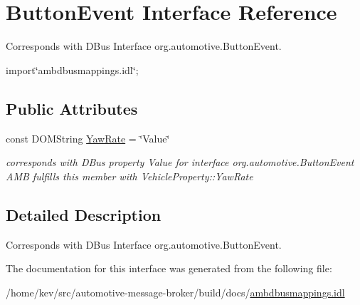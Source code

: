 \hypertarget{interfaceButtonEvent}{\section{Button\+Event Interface Reference}
\label{interfaceButtonEvent}
}


Corresponds with D\+Bus Interface org.\+automotive.\+Button\+Event.  




{\ttfamily import\char`\"{}ambdbusmappings.\+idl\char`\"{};}

\subsection*{Public Attributes}
\begin{DoxyCompactItemize}
\item 
\hypertarget{interfaceButtonEvent_a1d05bec7109151686be60fe3214f89eb}{const D\+O\+M\+String \hyperlink{interfaceButtonEvent_a1d05bec7109151686be60fe3214f89eb}{Yaw\+Rate} = \char`\"{}Value\char`\"{}}\label{interfaceButtonEvent_a1d05bec7109151686be60fe3214f89eb}

\begin{DoxyCompactList}\small\item\em corresponds with D\+Bus property Value for interface org.\+automotive.\+Button\+Event A\+M\+B fulfills this member with Vehicle\+Property\+::\+Yaw\+Rate \end{DoxyCompactList}\end{DoxyCompactItemize}


\subsection{Detailed Description}
Corresponds with D\+Bus Interface org.\+automotive.\+Button\+Event. 

The documentation for this interface was generated from the following file\+:\begin{DoxyCompactItemize}
\item 
/home/kev/src/automotive-\/message-\/broker/build/docs/\hyperlink{ambdbusmappings_8idl}{ambdbusmappings.\+idl}\end{DoxyCompactItemize}
